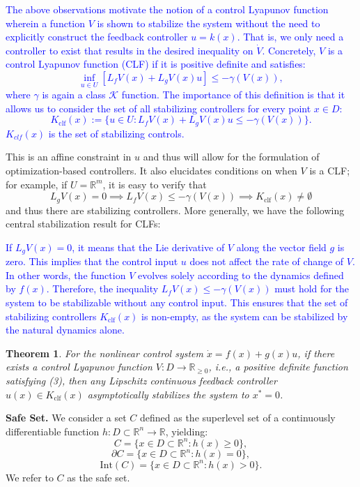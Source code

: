 \documentclass[12pt]{article}
\begin{document}
\textcolor{blue}{
The above observations motivate the notion of a control Lyapunov function wherein a function \( V \) is shown to stabilize the system without the need to explicitly construct the feedback controller \( u = k(x) \). That is, we only need a controller to exist that results in the desired inequality on \( \dot{V} \). Concretely, \( V \) is a control Lyapunov function (CLF) if it is positive definite and satisfies:
\[
\inf_{u \in U} [L_f V(x) + L_g V(x) u] \leq -\gamma(V(x)),
\]
where \( \gamma \) is again a class \( \mathcal{K} \) function. The importance of this definition is that it allows us to consider the set of all stabilizing controllers for every point \( x \in D \):
\[
K_{\text{clf}}(x) := \{ u \in U : L_f V(x) + L_g V(x) u \leq -\gamma(V(x)) \}.
\]
}
\textcolor{blue}{
$K_{clf}(x)$ is the set of stabilizing controls. 
}

This is an affine constraint in \( u \) and thus will allow for the formulation of optimization-based controllers. It also elucidates conditions on when \( V \) is a CLF; for example, if \( U = \mathbb{R}^m \), it is easy to verify that
\[
L_g V(x) = 0 \implies L_f V(x) \leq -\gamma(V(x)) \implies K_{\text{clf}}(x) \neq \emptyset
\]
and thus there are stabilizing controllers. More generally, we have the following central stabilization result for CLFs:

\textcolor{blue}{
If \( L_g V(x) = 0 \), it means that the Lie derivative of \( V \) along the vector field \( g \) is zero. This implies that the control input \( u \) does not affect the rate of change of \( V \). In other words, the function \( V \) evolves solely according to the dynamics defined by \( f(x) \). Therefore, the inequality \( L_f V(x) \leq -\gamma(V(x)) \) must hold for the system to be stabilizable without any control input. This ensures that the set of stabilizing controllers \( K_{\text{clf}}(x) \) is non-empty, as the system can be stabilized by the natural dynamics alone.
}

\newtheorem{theorem}{Theorem}

\begin{theorem}
For the nonlinear control system \( \dot{x} = f(x) + g(x)u \), if there exists a control Lyapunov function \( V : D \to \mathbb{R}_{\geq 0} \), i.e., a positive definite function satisfying (3), then any Lipschitz continuous feedback controller \( u(x) \in K_{\text{clf}}(x) \) asymptotically stabilizes the system to \( x^* = 0 \).
\end{theorem}


\textbf{Safe Set.}
We consider a set \( C \) defined as the superlevel set of a continuously differentiable function \( h : D \subset \mathbb{R}^n \to \mathbb{R} \), yielding:
\[
C = \{ x \in D \subset \mathbb{R}^n : h(x) \geq 0 \},
\]
\[
\partial C = \{ x \in D \subset \mathbb{R}^n : h(x) = 0 \},
\]
\[
\text{Int}(C) = \{ x \in D \subset \mathbb{R}^n : h(x) > 0 \}.
\]
We refer to \( C \) as the safe set.
\end{document}
